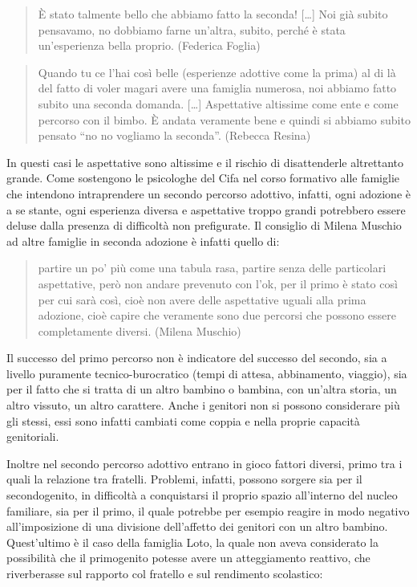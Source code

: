 \documentclass[12pt,oneside,svgnames]{memoir}
\newenvironment{quotationb}%
{\color{maincolor}\begin{leftbar}\begin{quotation}}%
{\end{quotation}\end{leftbar}\ignorespacesafterend}
\begin{document}
\begin{quotationb}
È stato talmente bello che abbiamo fatto la seconda! {[}\ldots{}{]} Noi
già subito pensavamo, no dobbiamo farne un'altra, subito, perché è stata
un'esperienza bella proprio. (Federica Foglia)
\end{quotationb}

\begin{quotationb}
Quando tu ce l'hai così belle (esperienze adottive come la prima) al di
là del fatto di voler magari avere una famiglia numerosa, noi abbiamo
fatto subito una seconda domanda. {[}\ldots{}{]} Aspettative altissime
come ente e come percorso con il bimbo. È andata veramente bene e quindi
si abbiamo subito pensato ``no no vogliamo la seconda''. (Rebecca
Resina)
\end{quotationb}

In questi casi le aspettative sono altissime e il rischio di
disattenderle altrettanto grande. Come sostengono le psicologhe del Cifa
nel corso formativo alle famiglie che intendono intraprendere un secondo
percorso adottivo, infatti, ogni adozione è a se stante, ogni esperienza
diversa e aspettative troppo grandi potrebbero essere deluse dalla
presenza di difficoltà non prefigurate. Il consiglio di Milena Muschio
ad altre famiglie in seconda adozione è infatti quello di:

\begin{quotationb}
partire un po' più come una tabula rasa, partire senza delle particolari
aspettative, però non andare prevenuto con l'ok, per il primo è stato
così per cui sarà così, cioè non avere delle aspettative uguali alla
prima adozione, cioè capire che veramente sono due percorsi che possono
essere completamente diversi. (Milena Muschio)
\end{quotationb}

Il successo del primo percorso non è indicatore del successo del
secondo, sia a livello puramente tecnico-burocratico (tempi di attesa,
abbinamento, viaggio), sia per il fatto che si tratta di un altro
bambino o bambina, con un'altra storia, un altro vissuto, un altro
carattere. Anche i genitori non si possono considerare più gli stessi,
essi sono infatti cambiati come coppia e nella proprie capacità
genitoriali.

Inoltre nel secondo percorso adottivo entrano in gioco fattori diversi,
primo tra i quali la relazione tra fratelli. Problemi, infatti, possono
sorgere sia per il secondogenito, in difficoltà a conquistarsi il
proprio spazio all'interno del nucleo familiare, sia per il primo, il
quale potrebbe per esempio reagire in modo negativo all'imposizione di
una divisione dell'affetto dei genitori con un altro bambino.
Quest'ultimo è il caso della famiglia Loto, la quale non aveva
considerato la possibilità che il primogenito potesse avere un
atteggiamento reattivo, che riverberasse sul rapporto col fratello e sul
rendimento scolastico:
\end{document}
